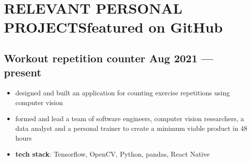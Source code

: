 \documentclass{article}
\begin{document}

\section{RELEVANT PERSONAL PROJECTS\hfill featured on GitHub}

\subsection{Workout repetition counter \hfill Aug 2021 --- present}
\begin{itemize}
  \itemsep0em
  \item designed and built an application for counting exercise repetitions using computer vision
  \item formed and lead a team of software engineers, computer vision researchers, a data analyst and a personal trainer to create a minimum viable product in 48 hours
  \item {\bfseries tech stack}: Tensorflow, OpenCV, Python, pandas, React Native
\end{itemize}

\end{document}
